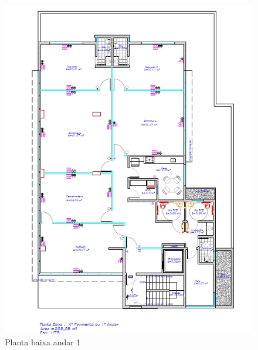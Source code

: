 \documentclass[	DIV=calc,%
							paper=a4,%
							fontsize=12pt,%
							onecolumn]{scrartcl}	 					%
\begin{document}
\begin{figure}
	\centering
	\includegraphics[width=\textwidth]{fig2}
	\caption{Planta baixa andar 1}
	\label{fig2}
\end{figure}
\end{document}
